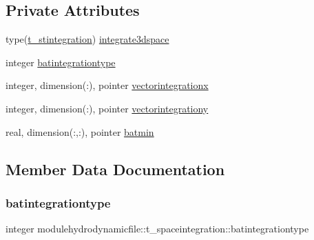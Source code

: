 \subsection*{Private Attributes}
\begin{DoxyCompactItemize}
\item 
type(\mbox{\hyperlink{structmodulehydrodynamicfile_1_1t__stintegration}{t\+\_\+stintegration}}) \mbox{\hyperlink{structmodulehydrodynamicfile_1_1t__spaceintegration_ac94a1b402931a822c7c7b2595090eaf3}{integrate3dspace}}
\item 
integer \mbox{\hyperlink{structmodulehydrodynamicfile_1_1t__spaceintegration_afb767241e4fabfc6bd79544e31fc6f21}{batintegrationtype}}
\item 
integer, dimension(\+:), pointer \mbox{\hyperlink{structmodulehydrodynamicfile_1_1t__spaceintegration_a165fa9c139689fe6346fa14b943b5f2e}{vectorintegrationx}}
\item 
integer, dimension(\+:), pointer \mbox{\hyperlink{structmodulehydrodynamicfile_1_1t__spaceintegration_ad6b24f11dc2f1b66e2ad82b4ccd6f0c9}{vectorintegrationy}}
\item 
real, dimension(\+:,\+:), pointer \mbox{\hyperlink{structmodulehydrodynamicfile_1_1t__spaceintegration_a0a4201aecc2591325c25b1f81ca05807}{batmin}}
\end{DoxyCompactItemize}


\subsection{Member Data Documentation}
\mbox{\label{structmodulehydrodynamicfile_1_1t__spaceintegration_afb767241e4fabfc6bd79544e31fc6f21}} 
\subsubsection{\texorpdfstring{batintegrationtype}{batintegrationtype}}
{\footnotesize\ttfamily integer modulehydrodynamicfile\+::t\+\_\+spaceintegration\+::batintegrationtype\hspace{0.3cm}{\ttfamily [private]}}

\mbox{\label{structmodulehydrodynamicfile_1_1t__spaceintegration_a0a4201aecc2591325c25b1f81ca05807}} 
